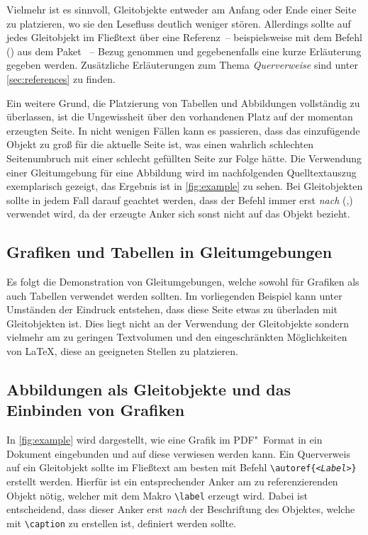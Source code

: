 \documentclass[%
  english,ngerman,%
  cdgeometry=no,DIV=12,%
  cd=false,cdfont=false,cdtitle=true,%
  headings=normal,%
  automark,%
  listof=toc,%
]{tudscrartcl}
\begin{document}
Vielmehr ist es sinnvoll, Gleitobjekte entweder am Anfang oder Ende einer Seite 
zu platzieren, wo sie den Lesefluss deutlich weniger stören. Allerdings sollte 
auf jedes Gleitobjekt im Fließtext über eine Referenz~-- beispielsweise mit dem 
Befehl () aus dem Paket ~-- 
Bezug genommen und gegebenenfalls eine kurze Erläuterung gegeben werden. 
Zusätzliche Erläuterungen zum Thema \emph{Querverweise} sind unter 
\autoref{sec:references} zu finden.

Ein weitere Grund,  die Platzierung von Tabellen und Abbildungen 
vollständig zu überlassen, ist die Ungewissheit über den vorhandenen Platz auf 
der momentan erzeugten Seite. In nicht wenigen Fällen kann es passieren, dass 
das einzufügende Objekt zu groß für die aktuelle Seite ist, was einen wahrlich 
schlechten Seitenumbruch mit einer schlecht gefüllten Seite zur Folge hätte.
Die Verwendung einer Gleitumgebung für eine Abbildung wird im nachfolgenden 
Quelltextauszug exemplarisch gezeigt, das Ergebnis ist in \autoref{fig:example} 
zu sehen. Bei Gleitobjekten sollte in jedem Fall darauf geachtet werden, dass 
der Befehl  immer erst \emph{nach} 
(,) verwendet wird, da 
der erzeugte Anker sich sonst nicht auf das Objekt bezieht.
%
\begin{Trunk+}
\section{Grafiken und Tabellen in Gleitumgebungen}
Es folgt die Demonstration von Gleitumgebungen, welche sowohl für 
Grafiken als auch Tabellen verwendet werden sollten. Im vorliegenden 
Beispiel kann unter Umständen der Eindruck entstehen, dass diese Seite 
etwas zu überladen mit Gleitobjekten ist. Dies liegt nicht an der 
Verwendung der Gleitobjekte sondern vielmehr am zu geringen Textvolumen 
und den eingeschränkten Möglichkeiten von \LaTeX{}, diese an geeigneten 
Stellen zu platzieren. 

\subsection{Abbildungen als Gleitobjekte und das Einbinden von Grafiken}
In \autoref{fig:example} wird dargestellt, wie eine Grafik im PDF"~Format 
in ein Dokument eingebunden und auf diese verwiesen werden kann. Ein 
Querverweis auf ein Gleitobjekt sollte im Fließtext am besten mit Befehl 
\texttt{\textbackslash autoref\{\emph{<Label>}\}} erstellt werden. 
Hierfür ist ein entsprechender Anker am zu referenzierenden Objekt nötig, 
welcher mit dem Makro \texttt{\textbackslash label} erzeugt wird. Dabei 
ist entscheidend, dass dieser Anker erst \emph{nach} der Beschriftung des 
Objektes, welche mit \texttt{\textbackslash caption} zu erstellen ist, 
definiert werden sollte.

\end{Trunk+}
\end{document}
